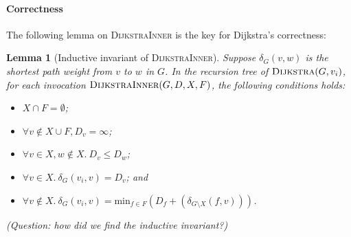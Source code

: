\documentclass[11pt,a4paper,oneside,microtype,chapter,nokorean]{oblivoir}
\newtheorem{lemma}[theorem]{Lemma}
\begin{document}
\paragraph{Correctness} The following lemma on \textsc{DijkstraInner} is the key for Dijkstra's
correctness:

\begin{lemma}[Inductive invariant of \textsc{DijkstraInner}] Suppose $\delta_G(v,w)$ is the shortest
  path weight from $v$ to $w$ in $G$.  In the recursion tree of $\textsc{Dijkstra}(G,v_i)$, for each
  invocation $\textsc{DijkstraInner}(G,D,X,F)$, the following conditions holds:
  \begin{itemize}
  \item $X \cap F = \emptyset$;
  \item $\forall v \notin X \cup F, D_v = \infty$;
  \item $\forall v\in X, w \notin X.~D_v \le D_w$;
  \item $\forall v \in X.~\delta_G(v_i,v) = D_v$; and
  \item
    $\forall v \notin X.~\delta_G(v_i,v) = \textrm{min}_{f \in F} (D_f + (\delta_{G \setminus
      X}(f,v)))$.
  \end{itemize}

  (Question: how did we find the inductive invariant?)
\end{lemma}
\end{document}
